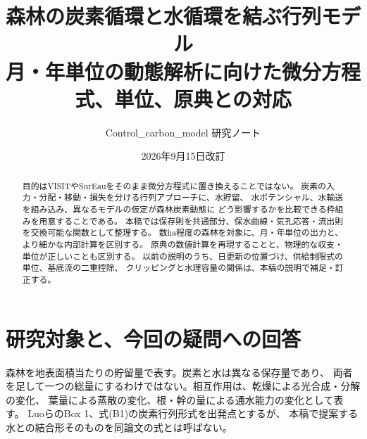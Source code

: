 \documentclass[a4paper,11pt]{ltjsarticle}
\title{森林の炭素循環と水循環を結ぶ行列モデル\\
\large 月・年単位の動態解析に向けた微分方程式、単位、原典との対応}
\author{Control\_carbon\_model 研究ノート}
\date{2026年9月15日改訂}
\begin{document}
\maketitle
\begin{abstract}
目的はVISITやSurEauをそのまま微分方程式に置き換えることではない。
炭素の入力・分配・移動・損失を分ける行列アプローチに、水貯留、
水ポテンシャル、水輸送を組み込み、異なるモデルの仮定が森林炭素動態に
どう影響するかを比較できる枠組みを用意することである。
本稿では保存則を共通部分、保水曲線・気孔応答・流出則を交換可能な関数として整理する。
数ha程度の森林を対象に、月・年単位の出力と、より細かな内部計算を区別する。
原典の数値計算を再現することと、物理的な収支・単位が正しいことも区別する。
以前の説明のうち、日更新の位置づけ、供給制限式の単位、基底流の二重控除、
クリッピングと水理容量の関係は、本稿の説明で補足・訂正する。
\end{abstract}
\tableofcontents
\clearpage

\section{研究対象と、今回の疑問への回答}
森林を地表面積当たりの貯留量で表す。炭素と水は異なる保存量であり、
両者を足して一つの総量にするわけではない。相互作用は、乾燥による光合成・分解の変化、
葉量による蒸散の変化、根・幹の量による通水能力の変化として表す。
Luoら\cite{luo}のBox 1、式(B1)の炭素行列形式を出発点とするが、
本稿で提案する水との結合形そのものを同論文の式とは呼ばない。
\end{document}
